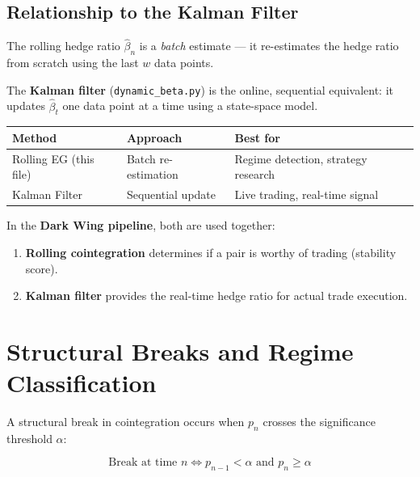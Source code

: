 \documentclass[12pt, a4paper]{article}
\begin{document}
\subsection{Relationship to the Kalman Filter}

The rolling hedge ratio $\hat\beta_n$ is a \emph{batch} estimate — it re-estimates the hedge 
ratio from scratch using the last $w$ data points.

The \textbf{Kalman filter} (\texttt{dynamic\_beta.py}) is the online, sequential equivalent: 
it updates $\hat\beta_t$ one data point at a time using a state-space model. 

\begin{center}
\begin{tabular}{@{}lll@{}}
\toprule
\textbf{Method} & \textbf{Approach} & \textbf{Best for} \\
\midrule
Rolling EG (this file)  & Batch re-estimation   & Regime detection, strategy research \\
Kalman Filter           & Sequential update     & Live trading, real-time signal \\
\bottomrule
\end{tabular}
\end{center}

In the \textbf{Dark Wing pipeline}, both are used together:
\begin{enumerate}
    \item \textbf{Rolling cointegration} determines if a pair is worthy of trading (stability score).
    \item \textbf{Kalman filter} provides the real-time hedge ratio for actual trade execution.
\end{enumerate}

\section{Structural Breaks and Regime Classification}

A structural break in cointegration occurs when $p_n$ crosses the significance threshold $\alpha$:

\begin{equation}
    \text{Break at time } n \iff p_{n-1} < \alpha \text{ and } p_n \geq \alpha
    \label{eq:break}
\end{equation}
\end{document}
